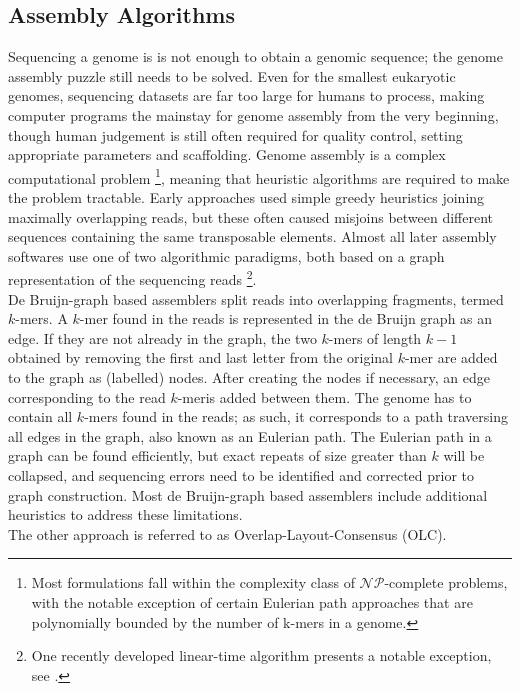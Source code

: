 \subsection*{Assembly Algorithms}

Sequencing a genome is is not enough to obtain a genomic sequence; the genome assembly puzzle still needs to be solved.
Even for the smallest eukaryotic genomes, sequencing datasets are far too large for humans to process, making computer programs the mainstay for genome assembly from the very beginning, though human judgement is still often required for quality control, setting appropriate parameters and scaffolding.
Genome assembly is a complex computational problem
\footnote{Most formulations fall within the complexity class of $\mathcal{NP}$-complete problems, with the notable exception of certain Eulerian path approaches that are polynomially bounded by the number of k-mers in a genome\cite{pop02, compeau11}.},
meaning that heuristic algorithms are required to make the problem tractable.
Early approaches used simple greedy heuristics joining maximally overlapping reads, but these often caused misjoins between different sequences containing the same transposable elements\cite{huang92, huang99, green96}.
Almost all later assembly softwares use one of two algorithmic paradigms, both based on a graph representation of the sequencing reads
\footnote{One recently developed linear-time algorithm presents a notable exception, see \cite{wong23}.}.\\
De Bruijn-graph based assemblers split reads into overlapping fragments, termed $k$-mers.
A $k$-mer found in the reads is represented in the de Bruijn graph as an edge.
If they are not already in the graph, the two $k$-mers of length $k-1$ obtained by removing the first and last letter from the original $k$-mer are added to the graph as (labelled) nodes.
After creating the nodes if necessary, an edge corresponding to the read $k$-meris added between them\cite{pevzner01, compeau11}.
The genome has to contain all $k$-mers found in the reads; as such, it corresponds to a path traversing all edges in the graph, also known as an Eulerian path.
The Eulerian path in a graph can be found efficiently, but exact repeats of size greater than $k$ will be collapsed, and sequencing errors need to be identified and corrected prior to graph construction.
Most de Bruijn-graph based assemblers include additional heuristics to address these limitations.\\
The other approach is referred to as Overlap-Layout-Consensus (OLC)\cite{kececioglu95}.
